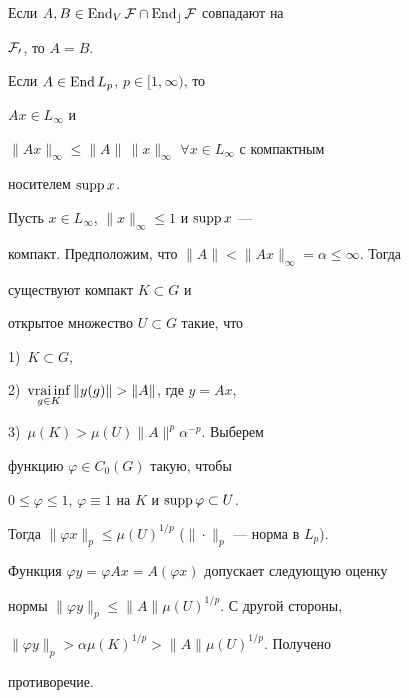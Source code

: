 


\begin{cor} Если $A,B\in\operatorname{End}_V\cal F\cap\operatorname{End}_c\cal F$ совпадают на 


$\cal F_0$, то $A=B$. 


\end{cor} 


 


\begin{lem} Если $A\in\operatorname{End} L_p$, $p\in[1,\infty)$, то 


$Ax\in L_\infty$ и 


$\|Ax\|_\infty\le\|A\|\,\|x\|_\infty$ $\forall x\in L_\infty$ с компактным 


носителем $\operatorname{supp} x$. 


\end{lem} 


 


\begin{pf} Пусть $x\in L_\infty$, $\|x\|_\infty\le 1$ и $\operatorname{supp} x$ --- 


компакт. Предположим, что $\|A\|<\|Ax\|_\infty=\alpha\le\infty$. Тогда 


существуют компакт $K\subset G$ и 


открытое множество $U\subset G$ такие, что 


1)~$K\subset G$, 


2)~$\vraiinf\limits_{g\in K}\|y(g)\|>\|A\|$, где $y=Ax$, 


3)~$\mu(K)>\mu(U)\|A\|^p\alpha^{-p}$. Выберем 


функцию $\varphi\in C_0(G)$ такую, чтобы 


$0\le\varphi\le1$, $\varphi\equiv 1$ на $K$ и $\operatorname{supp}\varphi\subset U$. 


Тогда $\|\varphi x\|_p\le\mu(U)^{1/p}$ ($\|\cdot\|_p$ --- норма в $L_p$). 


 


Функция $\varphi y=\varphi Ax=A(\varphi x)$ допускает следующую оценку 


нормы $\|\varphi y\|_p\le\|A\|\mu(U)^{1/p}$. С другой стороны, 


$\|\varphi y\|_p>\alpha\mu(K)^{1/p}>\|A\|\mu(U)^{1/p}$. Получено 


противоречие. 


\end{pf} 


 


